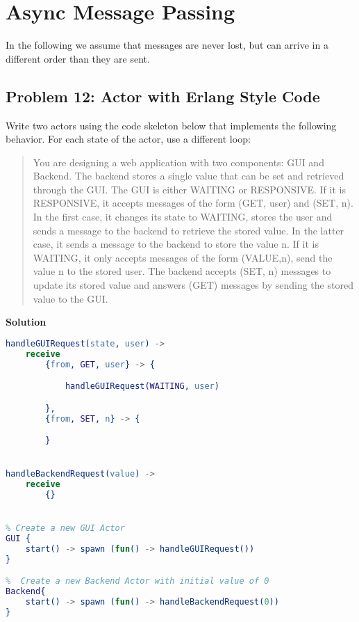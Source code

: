 \section{Async Message Passing}

In the following we assume that messages are never lost, but can arrive in a different order than
they are sent.

\subsection{Problem 12: Actor with Erlang Style Code}

Write two actors using the code skeleton below that implements the
following behavior. For each state of the actor, use a different loop: 

\begin{quote}
    You are designing a web application with two components: GUI and Backend. The
    backend stores a single value that can be set and retrieved through the GUI. The GUI
    is either WAITING or RESPONSIVE. If it is RESPONSIVE, it accepts messages
    of the form (GET, user) and (SET, n). In the first case, it changes its state to
    WAITING, stores the user and sends a message to the backend to retrieve the stored
    value. In the latter case, it sends a message to the backend to store the value n. If
    it is WAITING, it only accepts messages of the form (VALUE,n), send the value n
    to the stored user. The backend accepts (SET, n) messages to update its stored value and answers
    (GET) messages by sending the stored value to the GUI.
\end{quote}

\textbf{Solution}

\begin{lstlisting}[language=erlang]
handleGUIRequest(state, user) -> 
    receive
        {from, GET, user} -> {

            handleGUIRequest(WAITING, user)

        },
        {from, SET, n} -> {

        }


handleBackendRequest(value) -> 
    receive 
        {}


% Create a new GUI Actor
GUI {
    start() -> spawn (fun() -> handleGUIRequest())
}

%  Create a new Backend Actor with initial value of 0 
Backend{
    start() -> spawn (fun() -> handleBackendRequest(0))
}


\end{lstlisting}


